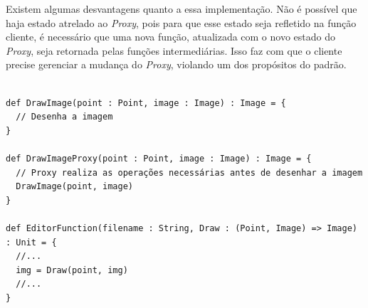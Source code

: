 Existem algumas desvantagens quanto a essa 
implementação. Não é possível que haja 
estado atrelado ao \textit{Proxy}, pois para que 
esse estado seja refletido na função 
cliente, é necessário que uma nova função, 
atualizada com o novo estado do \textit{Proxy}, seja 
retornada pelas funções intermediárias. 
Isso faz com que o cliente precise gerenciar 
a mudança do \textit{Proxy}, violando 
um dos propósitos do padrão. 

\begin{lstlisting}[caption={\textit{Proxy} Funcional.},label=fpproxy]
    
def DrawImage(point : Point, image : Image) : Image = {
  // Desenha a imagem
}

def DrawImageProxy(point : Point, image : Image) : Image = {
  // Proxy realiza as operações necessárias antes de desenhar a imagem
  DrawImage(point, image)
}

def EditorFunction(filename : String, Draw : (Point, Image) => Image) : Unit = {
  //...
  img = Draw(point, img)
  //...
}
    
\end{lstlisting}
